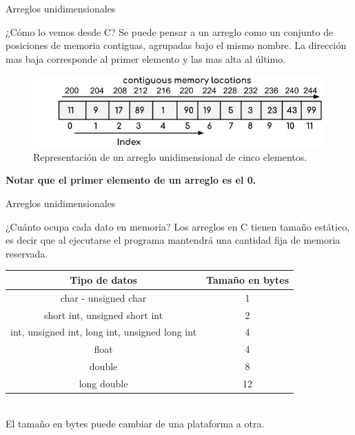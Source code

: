 \documentclass[xcolor=pdftex,table,11pt]{beamer}
\begin{document}
\begin{frame}{Arreglos unidimensionales}
\begin{block}{¿Cómo lo vemos desde C?}
Se puede pensar a un arreglo como un conjunto de posiciones de memoria contiguas, agrupadas bajo el mismo nombre. La dirección mas baja corresponde al primer elemento y las mas alta al último.
\end{block}

\begin{figure}
 \centering
\includegraphics[scale=0.5]{../img/exported/array_with_memory.jpg}
\caption{Representación de un arreglo unidimensional de cinco elementos.}
\end{figure}

\textbf{Notar que el primer elemento de un arreglo es el 0.}

\end{frame}

\begin{frame}{Arreglos unidimensionales}
\begin{block}{¿Cuánto ocupa cada dato en memoria?}
Los arreglos en C tienen tamaño estático, es decir que al ejecutarse el programa mantendrá una cantidad fija de memoria reservada.

\end{block}
\vspace{0.5cm}

\begin{tabular}{|c|c|}
\hline 
\textbf{Tipo de datos} & \textbf{Tamaño en bytes} \\ 
\hline 
char - unsigned char & 1\\ 
\hline 
short int, unsigned short int & 2 \\ 
\hline 
int, unsigned int, long int, unsigned long int & 4 \\ 
\hline 
float & 4 \\ 
\hline 
double & 8 \\ 
\hline
long double & 12\\ 
\hline 
\end{tabular} 
\vspace{0.3cm}
\\
El tamaño en bytes puede cambiar de una plataforma a otra.


\href{https://www.profesionalreview.com/2018/12/12/unidades-de-medida/}{}

\end{frame}
\end{document}
